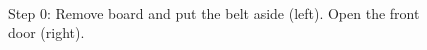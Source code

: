 \begin{figure}[!ht]
\mbox{\quad
{}}
\caption{Step 0: Remove board and put the belt aside (left). Open the front door (right).} %
\end{figure}


